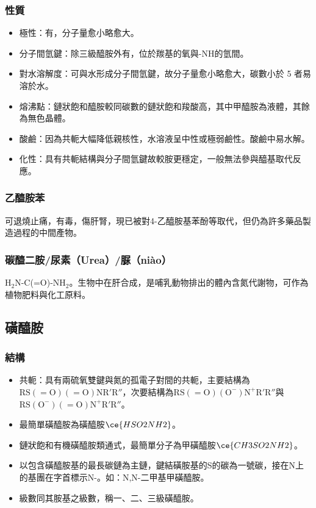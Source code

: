 \documentclass[a4paper,12pt]{report}
\begin{document}
\begin{itemize}
\subsubsection{性質}
\begin{itemize}
\item 極性：有，分子量愈小略愈大。
\item 分子間氫鍵：除三級醯胺外有，位於羰基的氧與-NH的氫間。
\item 對水溶解度：可與水形成分子間氫鍵，故分子量愈小略愈大，碳數小於 5 者易溶於水。
\item 熔沸點：鏈狀飽和醯胺較同碳數的鏈狀飽和羧酸高，其中甲醯胺為液體，其餘為無色晶體。
\item 酸鹼：因為共軛大幅降低親核性，水溶液呈中性或極弱鹼性。酸鹼中易水解。
\item 化性：具有共軛結構與分子間氫鍵故較胺更穩定，一般無法參與醯基取代反應。
\end{itemize}
\subsubsection{乙醯胺苯}
可退燒止痛，有毒，傷肝腎，現已被對4-乙醯胺基苯酚等取代，但仍為許多藥品製造過程的中間產物。
\subsubsection{碳醯二胺/尿素（Urea）/脲（niào）}
H$_2$N-C(=O)-NH$_2$。生物中在肝合成，是哺乳動物排出的體內含氮代謝物，可作為植物肥料與化工原料。
\subsection{磺醯胺}
\subsubsection{結構}
\begin{itemize}
\item 共軛：具有兩硫氧雙鍵與氮的孤電子對間的共軛，主要結構為$\mathrm{RS(=O)(=O)NR'R''}$，次要結構為$\mathrm{RS(=O)(O^-)N^+R'R''}$與$\mathrm{RS(O^-)(=O)N^+R'R''}$。
\item 最簡單磺醯胺為磺醯胺$\ce{HSO2NH2}$。
\item 鏈狀飽和有機磺醯胺類通式，最簡單分子為甲磺醯胺$\ce{CH3SO2NH2}$。
\item 以包含磺醯胺基的最長碳鏈為主鏈，鍵結磺胺基的S的碳為一號碳，接在N上的基團在字首標示N-。如：N,N-二甲基甲磺醯胺。
\item 級數同其胺基之級數，稱一、二、三級磺醯胺。
\end{itemize}

\end{itemize}
\end{document}
